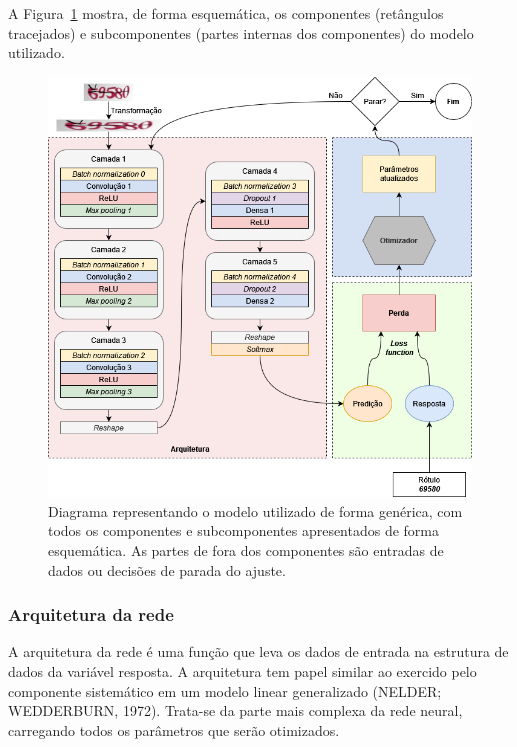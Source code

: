 \documentclass[12pt,twoside,brazilian]{book}
\begin{document}
A Figura~\ref{fig-diagrama-modelo-cnn} mostra, de forma esquemática, os
componentes (retângulos tracejados) e subcomponentes (partes internas
dos componentes) do modelo utilizado.

\begin{figure}

{\centering \includegraphics{./assets/img/diagrama-modelo-cnn.png}

}

\caption{\label{fig-diagrama-modelo-cnn}Diagrama representando o modelo
utilizado de forma genérica, com todos os componentes e subcomponentes
apresentados de forma esquemática. As partes de fora dos componentes são
entradas de dados ou decisões de parada do ajuste.}

\end{figure}

\hypertarget{sec-arquitetura-rede}{%
\subsubsection{Arquitetura da rede}\label{sec-arquitetura-rede}}

A arquitetura da rede é uma função que leva os dados de entrada na
estrutura de dados da variável resposta. A arquitetura tem papel similar
ao exercido pelo componente sistemático em um modelo linear generalizado
(NELDER; WEDDERBURN, 1972). Trata-se da parte mais complexa da rede
neural, carregando todos os parâmetros que serão otimizados.
\end{document}
